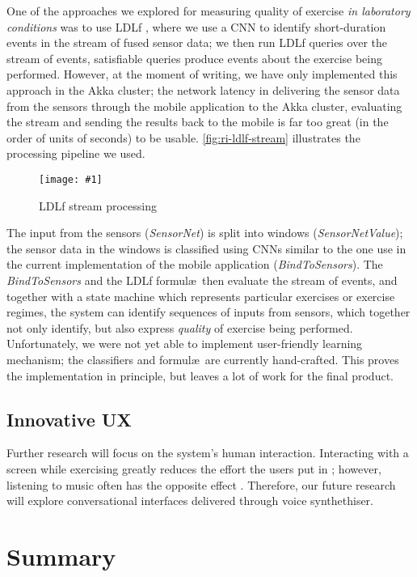 \documentclass[a4paper, 10 pt, conference]{IEEEtran}
\newcommand{\fig}[3]{
  \begin{figure}[h]
    \begin{center}
        \caption{#3}
        \texttt{[image: \#1]}
        \label{fig:#2}
    \end{center}
  \end{figure}
}
\begin{document}
One of the approaches we explored for measuring quality of exercise \emph{in laboratory conditions} was to use LDLf \cite{ldlf}, where we use a CNN to identify short-duration events in the stream of fused sensor data; we then run LDLf queries over the stream of events, satisfiable queries produce events about the exercise being performed. However, at the moment of writing, we have only implemented this approach in the Akka cluster; the network latency in delivering the sensor data from the sensors through the mobile application to the Akka cluster, evaluating the stream and sending the results back to the mobile is far too great (in the order of units of seconds) to be usable. \autoref{fig:ri-ldlf-stream} illustrates the processing pipeline we used.

\fig{ri-ldlf-stream.png}{ri-ldlf-stream}{LDLf stream processing}

The input from the sensors (\emph{SensorNet}) is split into windows (\emph{SensorNetValue}); the sensor data in the windows is classified using CNNs similar to the one use in the current implementation of the mobile application (\emph{BindToSensors}). The \emph{BindToSensors} and the LDLf formul\ae\ then evaluate the stream of events, and together with a state machine which represents particular exercises or exercise regimes, the system can identify sequences of inputs from sensors, which together not only identify, but also express \emph{quality} of exercise being performed. Unfortunately, we were not yet able to implement user-friendly learning mechanism; the classifiers and formul\ae\ are currently hand-crafted. This proves the implementation in principle, but leaves a lot of work for the final product.

\subsection{Innovative UX}

Further research will focus on the system's human interaction. Interacting with a screen while exercising greatly reduces the effort the users put in \cite{!!!}; however, listening to music often has the opposite effect \cite{!!!}. Therefore, our future research will explore conversational interfaces delivered through voice synthethiser. 


\section{Summary}
\end{document}
